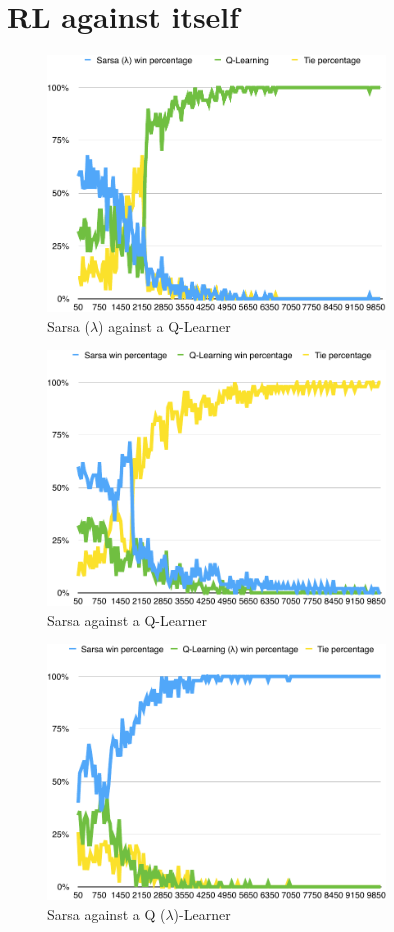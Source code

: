 \documentclass{journal}
\begin{document}
\section{RL against itself}\label{app:rl}
\begin{figure}[h]
	\includegraphics[width=0.8\textwidth]{SLVQ.pdf}
	\caption{Sarsa ($\lambda{}$) against a Q-Learner}
\end{figure}
\begin{figure}[h]
	\includegraphics[width=0.8\textwidth]{SVQ.pdf}
	\caption{Sarsa against a Q-Learner}
\end{figure}
\begin{figure}[h]
	\includegraphics[width=0.8\textwidth]{SVQL.pdf}
	\caption{Sarsa against a Q ($\lambda{}$)-Learner}
\end{figure}
\end{document}
